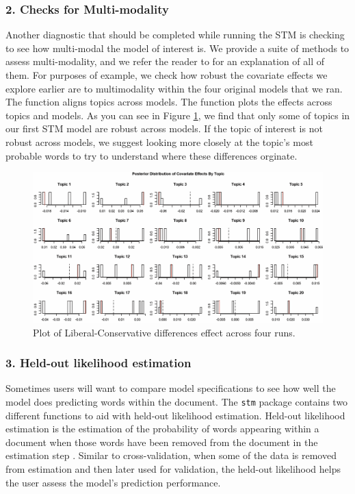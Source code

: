 \documentclass[nojss]{jss}
\begin{document}
\subsubsection{2. Checks for Multi-modality}
Another diagnostic that should be completed while running the STM is checking to see how multi-modal the model of interest is.  We provide a suite of methods to assess multi-modality, and we refer the reader to \citet{robertsnavigating} for an explanation of all of them.  For purposes of example, we check how robust the covariate effects we explore earlier are to multimodality within the four original models that we ran.  The function  aligns topics across models.  The function  plots the effects across topics and models.  As you can see in Figure \ref{fig:multi_poliblog}, we find that only some of topics  in our first STM model are robust across models.  If the topic of interest is not robust across models, we suggest looking more closely at the topic's most probable words to try to understand where these differences orginate.

\begin{figure}[h!]
  \centering
  \includegraphics[scale=.45]{multimod.png}
  \caption{Plot of Liberal-Conservative differences effect across four runs.}\label{fig:multi_poliblog}
\end{figure}

\subsubsection{3. Held-out likelihood estimation}
Sometimes users will want to compare model specifications to see how well the model does predicting words within the document.  The \texttt{stm} package contains two different functions to aid with held-out likelihood estimation.  Held-out likelihood estimation is the estimation of the probability of words appearing within a document when those words have been removed from the document in the estimation step \citep{blei2003latent}.  Similar to cross-validation, when some of the data is removed from estimation and then later used for validation, the held-out likelihood helps the user assess the model's prediction performance.
\end{document}
